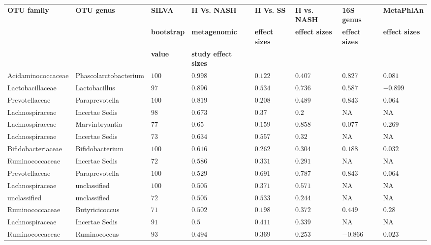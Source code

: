 \begin{table}[!ht]
\begin{tiny}
\begin{tabular}{|l|l|l|l|l|l|l|l|}
\hline
\bf{OTU family} & \bf{OTU genus} & \bf{SILVA} &\bf{H Vs. NASH} & \bf{H Vs. SS} & \bf{H vs. NASH} & \bf{16S genus} & \bf{MetaPhlAn}\\
& & \bf{bootstrap} & \bf{metagenomic} & \bf{effect sizes} & \bf{effect sizes} & \bf{effect sizes} & \bf{effect sizes}\\
& & \bf{value} & \bf{study effect sizes} & & & & \\ \hline
Acidaminococcaceae & Phascolarctobacterium & $100$ & $0.998$ & $0.122$ & $0.407$ & $0.827$ & $0.081$ \\ \hline
Lactobacillaceae & Lactobacillus & $97$ & $0.896$ & $0.534$ & $0.736$ & $0.587$ & $-0.899$ \\ \hline
Prevotellaceae & Paraprevotella & $100$ & $0.819$ & $0.208$ & $0.489$ & $0.843$ & $0.064$ \\ \hline
Lachnospiraceae & Incertae Sedis & $98$ & $0.673$ & $0.37$ & $0.2$ & NA & NA \\ \hline
Lachnospiraceae & Marvinbryantia & $77$ & $0.65$ & $0.159$ & $0.858$ & $0.077$ & $0.269$ \\ \hline
Lachnospiraceae & Incertae Sedis & $73$ & $0.634$ & $0.557$ & $0.32$ & NA & NA \\ \hline
Bifidobacteriaceae & Bifidobacterium & $100$ & $0.616$ & $0.262$ & $0.304$ & $0.188$ & $0.032$ \\ \hline
Ruminococcaceae & Incertae Sedis & $72$ & $0.586$ & $0.331$ & $0.291$ & NA & NA \\ \hline
Prevotellaceae & Paraprevotella & $100$ & $0.529$ & $0.691$ & $0.787$ & $0.843$ & $0.064$ \\ \hline
Lachnospiraceae & unclassified & $100$ & $0.505$ & $0.371$ & $0.571$ & NA & NA \\ \hline
unclassified & unclassified & $72$ & $0.505$ & $0.533$ & $0.244$ & NA & NA \\ \hline
Ruminococcaceae & Butyricicoccus & $71$ & $0.502$ & $0.198$ & $0.372$ & $0.449$ & $0.28$ \\ \hline
Lachnospiraceae & Incertae Sedis & $91$ & $0.5$ & $0.411$ & $0.339$ & NA & NA \\ \hline
Ruminococcaceae & Ruminococcus & $93$ & $0.494$ & $0.369$ & $0.253$ & $-0.866$ & $0.023$ \\ \hline

\end{tabular}
\end{tiny}
\end{table}
